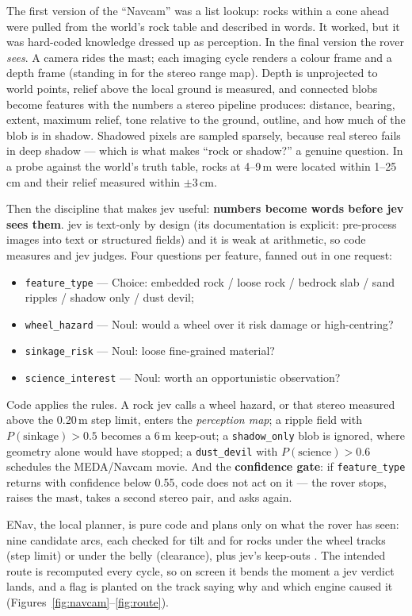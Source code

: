 \documentclass[11pt]{article}
\begin{document}
The first version of the ``Navcam'' was a list lookup: rocks within a cone ahead were pulled from the world's rock table and described in words. It worked, but it was hard-coded knowledge dressed up as perception. In the final version the rover \emph{sees}. A camera rides the mast; each imaging cycle renders a colour frame and a depth frame (standing in for the stereo range map). Depth is unprojected to world points, relief above the local ground is measured, and connected blobs become features with the numbers a stereo pipeline produces: distance, bearing, extent, maximum relief, tone relative to the ground, outline, and how much of the blob is in shadow. Shadowed pixels are sampled sparsely, because real stereo fails in deep shadow --- which is what makes ``rock or shadow?'' a genuine question. In a probe against the world's truth table, rocks at 4--9\,m were located within 1--25\,cm and their relief measured within $\pm 3$\,cm.

Then the discipline that makes jev useful: \textbf{numbers become words before jev sees them}. jev is text-only by design (its documentation is explicit: pre-process images into text or structured fields) and it is weak at arithmetic, so code measures and jev judges. Four questions per feature, fanned out in one request:
\begin{itemize}
\item \texttt{feature\_type} --- Choice: embedded rock / loose rock / bedrock slab / sand ripples / shadow only / dust devil;
\item \texttt{wheel\_hazard} --- Noul: would a wheel over it risk damage or high-centring?
\item \texttt{sinkage\_risk} --- Noul: loose fine-grained material?
\item \texttt{science\_interest} --- Noul: worth an opportunistic observation?
\end{itemize}
Code applies the rules. A rock jev calls a wheel hazard, or that stereo measured above the 0.20\,m step limit, enters the \emph{perception map}; a ripple field with $P(\text{sinkage})>0.5$ becomes a 6\,m keep-out; a \texttt{shadow\_only} blob is ignored, where geometry alone would have stopped; a \texttt{dust\_devil} with $P(\text{science})>0.6$ schedules the MEDA/Navcam movie. And the \textbf{confidence gate}: if \texttt{feature\_type} returns with confidence below 0.55, code does not act on it --- the rover stops, raises the mast, takes a second stereo pair, and asks again.

ENav, the local planner, is pure code and plans only on what the rover has seen: nine candidate arcs, each checked for tilt and for rocks under the wheel tracks (step limit) or under the belly (clearance), plus jev's keep-outs \cite{enav}. The intended route is recomputed every cycle, so on screen it bends the moment a jev verdict lands, and a flag is planted on the track saying why and which engine caused it (Figures~\ref{fig:navcam}--\ref{fig:route}).
\end{document}

